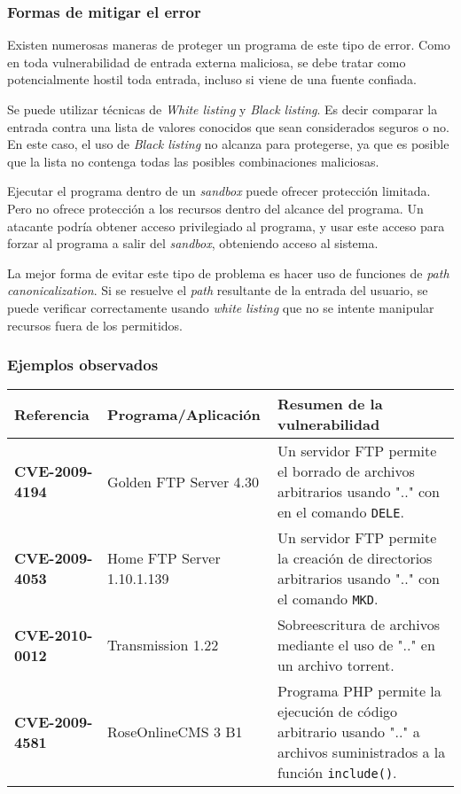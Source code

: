 \subsubsection{Formas de mitigar el error}

Existen numerosas maneras de proteger un programa de este tipo de error.
Como en toda vulnerabilidad de entrada externa maliciosa, se debe tratar como potencialmente hostil toda entrada, incluso si viene de una fuente confiada.

Se puede utilizar técnicas de \textit{White listing} y \textit{Black listing}.
Es decir comparar la entrada contra una lista de valores conocidos que sean considerados seguros o no.
En este caso, el uso de \textit{Black listing} no alcanza para protegerse, ya que es posible que la lista no contenga todas las posibles combinaciones maliciosas.

Ejecutar el programa dentro de un \textit{sandbox} puede ofrecer protección limitada.
Pero no ofrece protección a los recursos dentro del alcance del programa.
Un atacante podría obtener acceso privilegiado al programa, y usar este acceso para forzar al programa a salir del \textit{sandbox}, obteniendo acceso al sistema.

La mejor forma de evitar este tipo de problema es hacer uso de funciones de \textit{path canonicalization}.
Si se resuelve el \textit{path} resultante de la entrada del usuario, se puede verificar correctamente usando \textit{white listing} que no se intente manipular recursos fuera de los permitidos.

\subsubsection{Ejemplos observados}

\begin{tabular}[\baselineskip]{|p{1.75cm}|p{3.5cm}|p{8cm}|}
  \hline
  \textbf{Referencia} & Programa/Aplicación & Resumen de la vulnerabilidad \\
  \hline
  \textbf{CVE-2009-4194} & Golden FTP Server 4.30 & Un servidor FTP permite el borrado de archivos arbitrarios usando ".." con en el comando \texttt{DELE}. \\
  \hline
  \textbf{CVE-2009-4053} & Home FTP Server 1.10.1.139 & Un servidor FTP permite la creación de directorios arbitrarios usando ".." con el comando \texttt{MKD}.\\
  \hline
  \textbf{CVE-2010-0012} & Transmission 1.22 & Sobreescritura de archivos mediante el uso de ".." en un archivo torrent. \\
  \hline
  \textbf{CVE-2009-4581} & RoseOnlineCMS 3 B1 & Programa PHP permite la ejecución de código arbitrario usando ".." a archivos suministrados a la función \texttt{include()}. \\
  \hline
\end{tabular}
